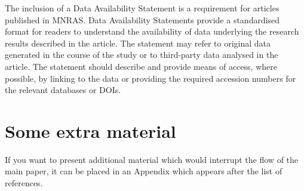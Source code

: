 \documentclass[fleqn,usenatbib]{mnras}
\begin{document}
 
The inclusion of a Data Availability Statement is a requirement for articles published in MNRAS. Data Availability Statements provide a standardised format for readers to understand the availability of data underlying the research results described in the article. The statement may refer to original data generated in the course of the study or to third-party data analysed in the article. The statement should describe and provide means of access, where possible, by linking to the data or providing the required accession numbers for the relevant databases or DOIs.







 





\appendix

\section{Some extra material}

If you want to present additional material which would interrupt the flow of the main paper,
it can be placed in an Appendix which appears after the list of references.



\bsp	%
\label{lastpage}
\end{document}
